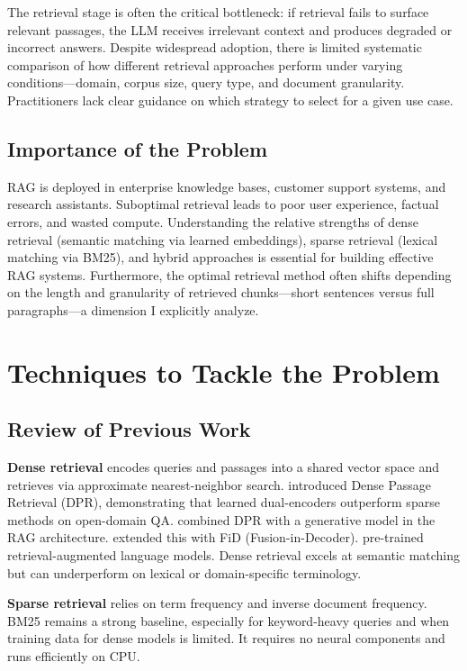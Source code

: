 \documentclass[twoside, 11pt]{article}
\begin{document}
The retrieval stage is often the critical bottleneck: if retrieval fails to surface relevant passages, the LLM receives irrelevant context and produces degraded or incorrect answers. Despite widespread adoption, there is limited systematic comparison of how different retrieval approaches perform under varying conditions---domain, corpus size, query type, and document granularity. Practitioners lack clear guidance on which strategy to select for a given use case.

\subsection{Importance of the Problem}
RAG is deployed in enterprise knowledge bases, customer support systems, and research assistants. Suboptimal retrieval leads to poor user experience, factual errors, and wasted compute. Understanding the relative strengths of dense retrieval (semantic matching via learned embeddings), sparse retrieval (lexical matching via BM25), and hybrid approaches is essential for building effective RAG systems. Furthermore, the optimal retrieval method often shifts depending on the length and granularity of retrieved chunks---short sentences versus full paragraphs---a dimension I explicitly analyze.

\section{Techniques to Tackle the Problem}
\subsection{Review of Previous Work}
\textbf{Dense retrieval} encodes queries and passages into a shared vector space and retrieves via approximate nearest-neighbor search. \citet{karpukhin2020dense} introduced Dense Passage Retrieval (DPR), demonstrating that learned dual-encoders outperform sparse methods on open-domain QA. \citet{lewis2020rag} combined DPR with a generative model in the RAG architecture. \citet{izacard2021leveraging} extended this with FiD (Fusion-in-Decoder). \citet{guu2020realm} pre-trained retrieval-augmented language models. Dense retrieval excels at semantic matching but can underperform on lexical or domain-specific terminology.

\textbf{Sparse retrieval} relies on term frequency and inverse document frequency. BM25 \citep{robertson2009probabilistic} remains a strong baseline, especially for keyword-heavy queries and when training data for dense models is limited. It requires no neural components and runs efficiently on CPU.
\end{document}
